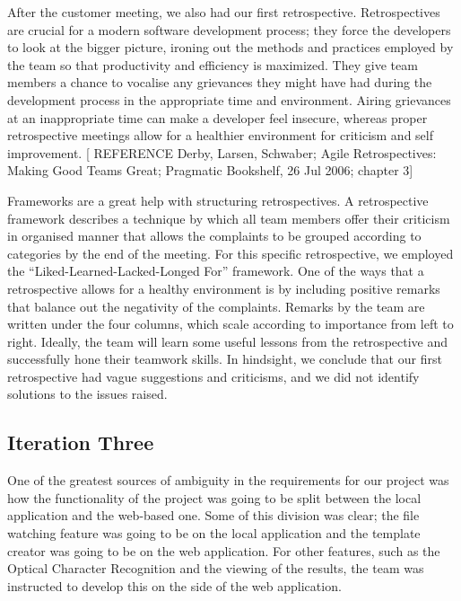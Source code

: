 \documentclass{l3proj}
\begin{document}
After the customer meeting, we also had our first retrospective. Retrospectives are crucial for a modern software development process; they force the developers to look at the bigger picture, ironing out the methods and practices employed by the team so that productivity and efficiency is maximized. They give team members a chance to vocalise any grievances they might have had during the development process in the appropriate time and environment. Airing grievances at an inappropriate time can make a developer feel insecure, whereas proper retrospective meetings allow for a healthier environment for criticism and self improvement. [ REFERENCE Derby, Larsen, Schwaber; Agile Retrospectives: Making Good Teams Great; Pragmatic Bookshelf, 26 Jul 2006; chapter 3]

Frameworks are a great help with structuring retrospectives. A retrospective framework describes a technique by which all team members offer their criticism in organised manner that allows the complaints to be grouped according to categories by the end of the meeting. For this specific retrospective, we employed the ``Liked-Learned-Lacked-Longed For'' framework. One of the ways that a retrospective allows for a healthy environment is by including positive remarks that balance out the negativity of the complaints. Remarks by the team are written under the four columns, which scale according to importance from left to right. Ideally, the team will learn some useful lessons from the retrospective and successfully hone their teamwork skills. In hindsight, we conclude that our first retrospective had vague suggestions and criticisms, and we did not identify solutions to the issues raised.

\subsection{Iteration Three}

One of the greatest sources of ambiguity in the requirements for our project was how the functionality of the project was going to be split between the local application and the web-based one. Some of this division was clear; the file watching feature was going to be on the local application and the template creator was going to be on the web application. For other features, such as the Optical Character Recognition and the viewing of the results, the team was instructed to develop this on the side of the web application.
\end{document}
